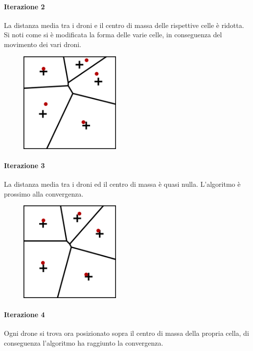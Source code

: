 \documentclass[11pt,a4paper]{report}
\begin{document}
\paragraph{Iterazione 2}

La distanza media tra i droni e il centro di massa delle rispettive celle è ridotta. Si noti come si è modificata la forma delle varie celle, in conseguenza del movimento dei vari droni.

\begin{figure}[H]
\includegraphics[width=5cm]{lloyd_iterazione_2.png}
\centering
\end{figure}

\paragraph{Iterazione 3}

La distanza media tra i droni ed il centro di massa è quasi nulla. L'algoritmo è prossimo alla convergenza.

\begin{figure}[H]
\includegraphics[width=5cm]{lloyd_iterazione_3.png}
\centering
\end{figure}

\paragraph{Iterazione 4}

Ogni drone si trova ora posizionato sopra il centro di massa della propria cella, di conseguenza l'algoritmo ha raggiunto la convergenza.
\end{document}
